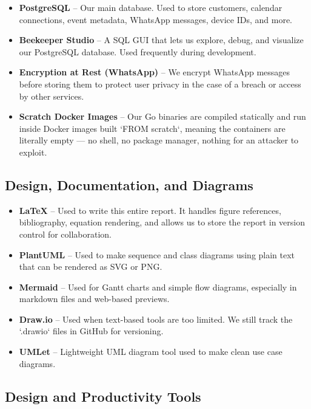 \begin{itemize}
    \item \textbf{PostgreSQL} – Our main database. Used to store customers, calendar connections, event metadata, WhatsApp messages, device IDs, and more.
    \item \textbf{Beekeeper Studio} – A SQL GUI that lets us explore, debug, and visualize our PostgreSQL database. Used frequently during development.
    \item \textbf{Encryption at Rest (WhatsApp)} – We encrypt WhatsApp messages before storing them to protect user privacy in the case of a breach or access by other services.
    \item \textbf{Scratch Docker Images} – Our Go binaries are compiled statically and run inside Docker images built `FROM scratch`, meaning the containers are literally empty — no shell, no package manager, nothing for an attacker to exploit.
\end{itemize}

\subsection{Design, Documentation, and Diagrams}

\begin{itemize}
    \item \textbf{LaTeX} – Used to write this entire report. It handles figure references, bibliography, equation rendering, and allows us to store the report in version control for collaboration.
    \item \textbf{PlantUML} – Used to make sequence and class diagrams using plain text that can be rendered as SVG or PNG.
    \item \textbf{Mermaid} – Used for Gantt charts and simple flow diagrams, especially in markdown files and web-based previews.
    \item \textbf{Draw.io} – Used when text-based tools are too limited. We still track the `.drawio` files in GitHub for versioning.
    \item \textbf{UMLet} – Lightweight UML diagram tool used to make clean use case diagrams.
\end{itemize}

\subsection{Design and Productivity Tools}

